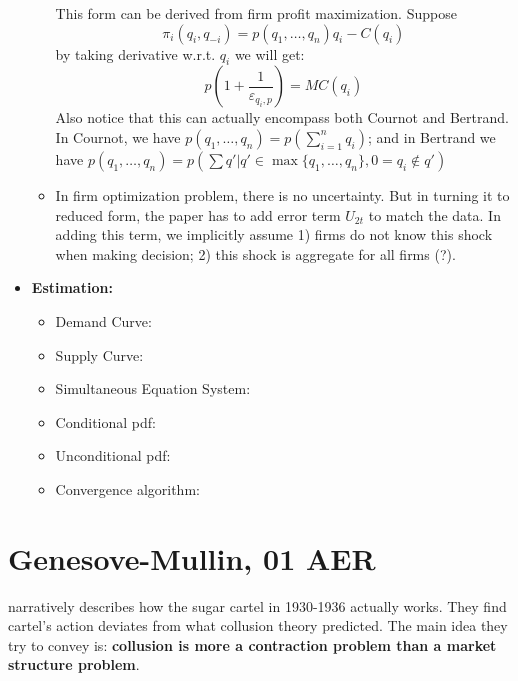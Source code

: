\documentclass{book}
\theoremstyle{plain}
\theoremstyle{definition}
\begin{document}
\begin{itemize}
\begin{itemize}
		\begin{mdframed}[style=comment]
			This form can be derived from firm profit maximization. Suppose \[\pi_i(q_i,q_{-i}) =p(q_1,\dots,q_n)q_i-C(q_i) \]
			by taking derivative w.r.t. $q_i$ we will get:
			\[p(1+\frac{1}{\varepsilon_{q_i,p}})=MC(q_i)\]
			Also notice that this can actually encompass both Cournot and Bertrand. In Cournot, we have $p(q_1,\dots,q_n)=p(\sum_{i=1}^nq_i)$; and in Bertrand we have $p(q_1,\dots,q_n) = p(\sum q'|q' \in \max\{q_1,\dots,q_n\},0=q_i\notin q')$

		\end{mdframed}
		\item In firm optimization problem, there is no uncertainty. But in turning it to reduced form, the paper has to add error term $U_{2t}$ to match the data. In adding this term, we implicitly assume 1) firms do not know this shock when making decision; 2) this shock is aggregate for all firms (?).
	\end{itemize}
	\item \textbf{Estimation:}
	\begin{itemize}
		\item Demand Curve:
		\item Supply Curve:
		\item Simultaneous Equation System:
		\item Conditional pdf:
		\item Unconditional pdf:
		\item Convergence algorithm:
	\end{itemize}
\end{itemize}




\section{Genesove-Mullin, 01 AER} %
\label{sec:genesove_mullin_01_aer}

\textbf{}

\cite{Genesove:2001jz} narratively describes how the sugar cartel in 1930-1936 actually works.
They find cartel's action deviates from what collusion theory predicted.
The main idea they try to convey is: \textbf{collusion is more a contraction problem than a market structure problem}. 
\end{document}
